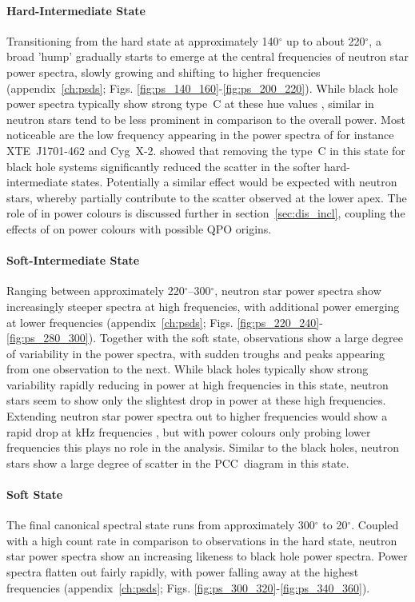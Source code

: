 \paragraph{Hard-Intermediate State} Transitioning from the hard state at approximately 140$^\circ$ up to about 220$^\circ$, a broad 'hump' gradually starts to emerge at the central frequencies of neutron star power spectra, slowly growing and shifting to higher frequencies (appendix~\ref{ch:psds}; Figs. \ref{fig:ps_140_160}-\ref{fig:ps_200_220}). While black hole power spectra typically show strong type~C \QPOs at these hue values \citep{heil2015power}, similar \QPOs in neutron stars tend to be less prominent in comparison to the overall power. Most noticeable are the low frequency \QPOs appearing in the power spectra of for instance XTE~J1701-462 and Cyg~X-2. \citet{heil2015inclination} showed that removing the type~C \QPOs in this state for black hole systems significantly reduced the scatter in the softer hard-intermediate states. Potentially a similar effect would be expected with neutron stars, whereby \QPOs partially contribute to the scatter observed at the lower apex. The role of \QPOs in power colours is discussed further in section~\ref{sec:dis_incl}, coupling the effects of \QPOs on power colours with possible \ac{QPO} origins.

\paragraph{Soft-Intermediate State} Ranging between approximately 220$^\circ$--300$^\circ$, neutron star power spectra show increasingly steeper spectra at high frequencies, with additional power emerging at lower frequencies (appendix~\ref{ch:psds}; Figs. \ref{fig:ps_220_240}-\ref{fig:ps_280_300}). Together with the soft state, observations show a large degree of variability in the power spectra, with sudden troughs and peaks appearing from one observation to the next. While black holes typically show strong variability rapidly reducing in power at high frequencies in this state, neutron stars seem to show only the slightest drop in power at these high frequencies. Extending neutron star power spectra out to higher frequencies would show a rapid drop at kHz frequencies \citep{kleinwolt}, but with power colours only probing lower frequencies this plays no role in the analysis. Similar to the black holes, neutron stars show a large degree of scatter in the \ac{PCC}~diagram in this state.

\paragraph{Soft State} The final canonical spectral state runs from approximately 300$^\circ$ to 20$^\circ$. Coupled with a high count rate in comparison to observations in the hard state, neutron star power spectra show an increasing likeness to black hole power spectra. Power spectra flatten out fairly rapidly, with power falling away at the highest frequencies (appendix~\ref{ch:psds}; Figs. \ref{fig:ps_300_320}-\ref{fig:ps_340_360}). \\

